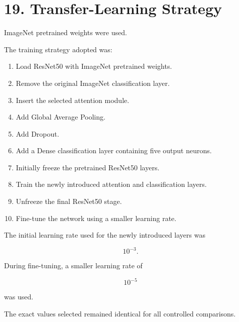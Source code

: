 \documentclass[10pt]{article}
\begin{document}
\section*{19. Transfer-Learning Strategy}

ImageNet pretrained weights were used.

The training strategy adopted was:

\begin{enumerate}

\item Load ResNet50 with ImageNet pretrained weights.

\item Remove the original ImageNet classification layer.

\item Insert the selected attention module.

\item Add Global Average Pooling.

\item Add Dropout.

\item Add a Dense classification layer containing five output neurons.

\item Initially freeze the pretrained ResNet50 layers.

\item Train the newly introduced attention and classification layers.

\item Unfreeze the final ResNet50 stage.

\item Fine-tune the network using a smaller learning rate.

\end{enumerate}

The initial learning rate used for the newly introduced layers was

\[
10^{-3}.
\]

During fine-tuning, a smaller learning rate of

\[
10^{-5}
\]

was used.

The exact values selected remained identical for all
controlled comparisons.
\end{document}
